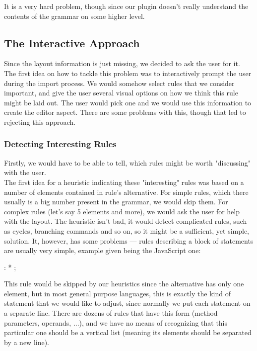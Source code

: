 It is a very hard problem, though since our plugin doesn't really understand the contents of the grammar on some higher level.

\subsection{The Interactive Approach}

Since the layout information is just missing, we decided to ask the user for it.
The first idea on how to tackle this problem was to interactively prompt the user during the import process.
We would somehow select rules that we consider important, and give the user several visual options on how we think this rule might be laid out.
The user would pick one and we would use this information to create the editor aspect.
There are some problems with this, though that led to rejecting this approach.

\subsubsection{Detecting Interesting Rules}

Firstly, we would have to be able to tell, which rules might be worth "discussing" with the user.
\\

The first idea for a heuristic indicating these "interesting" rules was based on a number of elements contained in rule's alternative.
For simple rules, which there usually is a big number present in the grammar, we would skip them.
For complex rules (let's say 5 elements and more), we would ask the user for help with the layout.
The heuristic isn't bad, it would detect complicated rules, such as cycles, branching commands and so on, so it might be a sufficient, yet simple, solution.
It, however, has some problems --- rules describing a block of statements are usually very simple, example given being the JavaScript one:

\begin{antlr}
	 : * ;
\end{antlr}

This rule would be skipped by our heuristics since the alternative has only one element, but in most general purpose languages, this is exactly the kind of statement that we would like to adjust, since normally we put each statement on a separate line.
There are dozens of rules that have this form (method parameters, operands, ...), and we have no means of recognizing that this particular one should be a vertical list (meaning its elements should be separated by a new line).
\\

